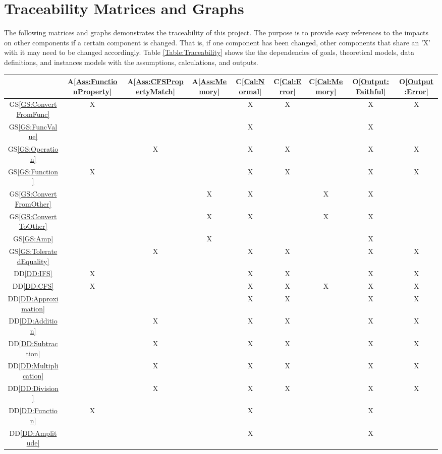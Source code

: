 \documentclass[12pt]{article}
\newcommand{\ddref}[1]{DD\ref{#1}}
\newcommand{\aref}[1]{A\ref{#1}}
\newcommand{\calref}[1]{C\ref{#1}}
\newcommand{\oref}[1]{O\ref{#1}}
\newcommand{\gsref}[1]{GS\ref{#1}}
\begin{document}
\section{Traceability Matrices and Graphs}
The following matrices and graphs demonstrates the traceability of this project. The purpose is to provide easy references to the impacts on other components if a certain component is changed. That is, if one component has been changed, other components that share an 'X' with it may need to be changed accordingly. Table \ref{Table:Traceability} shows the the dependencies of goals, theoretical models, data definitions, and instances models with the assumptions, calculations, and outputs.
\begin{table}
	\centering
	\begin{tabular}{|c|c|c|c|c|c|c|c|c|}
		\hline
		&\aref{Ass:FunctionProperty}&\aref{Ass:CFSPropertyMatch}&\aref{Ass:Memory}&\calref{Cal:Normal}&\calref{Cal:Error}&\calref{Cal:Memory}&\oref{Output:Faithful}&\oref{Output:Error}\\
		\hline
		\gsref{GS:ConvertFromFunc}
		&X& & &X&X&  &X&X\\\hline
		\gsref{GS:FuncValue}
		& & & &X& & &X& \\\hline
		\gsref{GS:Operation}
		& &X& &X&X& &X&X \\\hline
		\gsref{GS:Function}
		&X& & &X&X& &X&X\\\hline
		\gsref{GS:ConvertFromOther}
		& & &X&X& &X&X& \\\hline
		\gsref{GS:ConvertToOther}
		& & &X&X& &X&X& \\\hline
		\gsref{GS:Amp}
		& & &X& & & &X& \\\hline
		\gsref{GS:ToleratedEquality}
		& &X& &X&X& &X&X\\\hline
		\ddref{DD:IFS}
		&X& & &X&X& &X&X\\\hline
		\ddref{DD:CFS}
		&X& & &X&X&X&X&X\\\hline
		\ddref{DD:Approximation}
		& & & &X&X& &X&X\\\hline
		\ddref{DD:Addition}
		& &X& &X&X& &X&X\\\hline
		\ddref{DD:Subtraction}
		& &X& &X&X& &X&X\\\hline
		\ddref{DD:Multiplication}
		& &X& &X&X& &X&X\\\hline
		\ddref{DD:Division}
		& &X& &X&X& &X&X\\\hline
		\ddref{DD:Function}
		&X& & &X& & &X& \\\hline
		\ddref{DD:Amplitude}
		& & & &X& & &X& \\\hline

\end{tabular}
\end{table}
\end{document}
